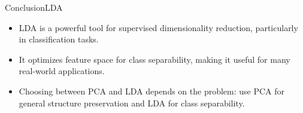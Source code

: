 \documentclass[11pt]{beamer}
\begin{document}
%
%
\begin{frame}{Conclusion}{LDA}
    \begin{itemize}
        \item LDA is a powerful tool for supervised dimensionality reduction, particularly in classification tasks.
        \item It optimizes feature space for class separability, making it useful for many real-world applications.
        \item Choosing between PCA and LDA depends on the problem: use PCA for general structure preservation and LDA for class separability.
    \end{itemize}
\end{frame}
\end{document}
